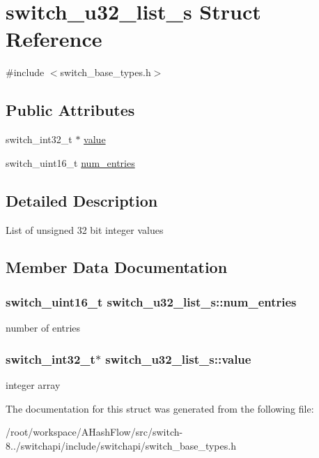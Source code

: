 \hypertarget{structswitch__u32__list__s}{\section{switch\+\_\+u32\+\_\+list\+\_\+s Struct Reference}
\label{structswitch__u32__list__s}
}


{\ttfamily \#include $<$switch\+\_\+base\+\_\+types.\+h$>$}

\subsection*{Public Attributes}
\begin{DoxyCompactItemize}
\item 
switch\+\_\+int32\+\_\+t $\ast$ \hyperlink{structswitch__u32__list__s_a818e113ac95bba1dbefae5a3d588dbb5}{value}
\item 
switch\+\_\+uint16\+\_\+t \hyperlink{structswitch__u32__list__s_af6a49b215d1ac1fc5b8f5455bc6f326f}{num\+\_\+entries}
\end{DoxyCompactItemize}


\subsection{Detailed Description}
List of unsigned 32 bit integer values 

\subsection{Member Data Documentation}
\hypertarget{structswitch__u32__list__s_af6a49b215d1ac1fc5b8f5455bc6f326f}{
\subsubsection[{num\+\_\+entries}]{\setlength{\rightskip}{0pt plus 5cm}switch\+\_\+uint16\+\_\+t switch\+\_\+u32\+\_\+list\+\_\+s\+::num\+\_\+entries}}\label{structswitch__u32__list__s_af6a49b215d1ac1fc5b8f5455bc6f326f}
number of entries \hypertarget{structswitch__u32__list__s_a818e113ac95bba1dbefae5a3d588dbb5}{
\subsubsection[{value}]{\setlength{\rightskip}{0pt plus 5cm}switch\+\_\+int32\+\_\+t$\ast$ switch\+\_\+u32\+\_\+list\+\_\+s\+::value}}\label{structswitch__u32__list__s_a818e113ac95bba1dbefae5a3d588dbb5}
integer array 

The documentation for this struct was generated from the following file\+:\begin{DoxyCompactItemize}
\item 
/root/workspace/\+A\+Hash\+Flow/src/switch-\/8../switchapi/include/switchapi/switch\+\_\+base\+\_\+types.\+h\end{DoxyCompactItemize}
